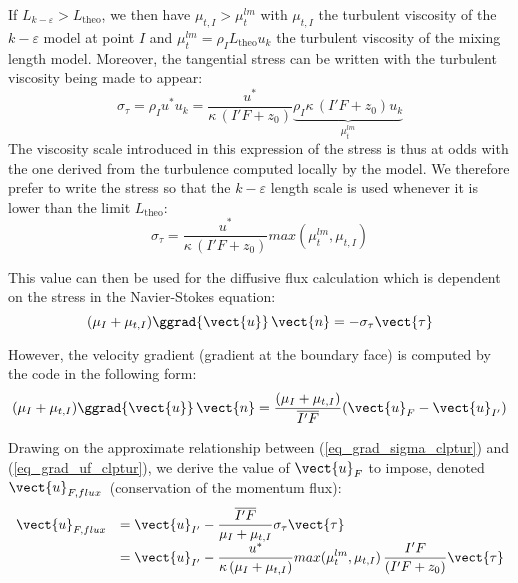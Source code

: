 If $L_{k-\varepsilon}>L_{\text{theo}}$, we then have  $\mu_{t,I}>\mu_{t}^{lm}$
with $\mu_{t,I}$ the turbulent viscosity of the $k-\varepsilon$ model at
point $I$ and $\mu_{t}^{lm}=\rho_I L_{\text{theo}}u_k$ the turbulent
viscosity of the mixing length model. Moreover, the tangential stress
can be written with the turbulent viscosity being made to appear:
\begin{equation}
\sigma_\tau = \rho_Iu^*u_k = \displaystyle\frac{u^*}{\kappa\,
 \left(I'F+z_0 \right)}
\underbrace{\rho_I\kappa\, \left( I'F+z_0 \right)  u_k}_{\mu^{lm}_t}
\end{equation}
The viscosity scale introduced in this expression of the stress is thus at odds
with the one derived from the turbulence computed locally by the model. We therefore
prefer to write the stress so that the $k-\varepsilon$ length scale is used whenever
it is lower than the limit $L_{\text{theo}}$:
\begin{equation}
\sigma_\tau = \displaystyle\frac{u^*}{\kappa\, \left(I'F+z_0 \right)} max(\mu_{t}^{lm},\mu_{t,I})
\end{equation}

This value can then be used for the diffusive flux calculation which is dependent on the
stress in the Navier-Stokes equation:
\begin{equation}\label{eq_grad_sigma_clptur}
(\mu_I+\mu_{t,I})\ggrad{\vect{u}}\,\vect{n}=-\sigma_\tau \vect{\tau}
\end{equation}

However, the velocity gradient (gradient at the boundary face) is computed by the
code in the following form:
\begin{equation}\label{eq_grad_uf_clptur}
(\mu_I+\mu_{t,I})\ggrad{\vect{u}}\,\vect{n}=
\displaystyle\frac{(\mu_I+\mu_{t,I})}{\overline{I'F}}(\vect{u}_F-\vect{u}_{I'})
\end{equation}

Drawing on the approximate relationship between (\ref{eq_grad_sigma_clptur}) and
(\ref{eq_grad_uf_clptur}), we derive the value of $\vect{u}_F$ to impose,
denoted $\vect{u}_{F,flux}$~(conservation of the momentum flux):
\begin{equation}\label{eq_uf_flux_clptur}
\begin{array}{ll}
\vect{u}_{F,flux}&=\vect{u}_{I'}-\displaystyle\frac{\overline{I'F}}{\mu_I+\mu_{t,I}}\sigma_\tau \vect{\tau}\\
                 &=\vect{u}_{I'}-\displaystyle\frac{u^*}{\kappa\,
		  (\mu_I+\mu_{t,I})} max(\mu_{t}^{lm},\mu_{t,I})
		  \, \displaystyle\frac {I'F} {\left(I'F+z_0 \right)} \vect{\tau}
\end{array}
\end{equation}

